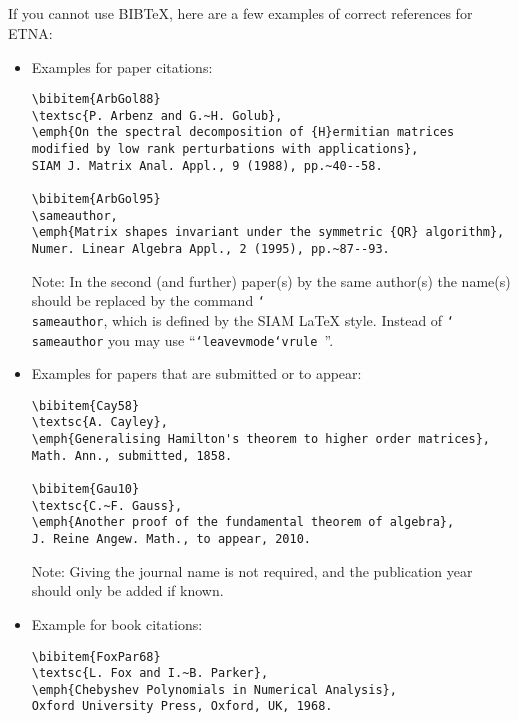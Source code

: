 \documentclass[10pt]{article}
\begin{document}
\begin{center}\begin{verbatim}
         
         
\end{verbatim}\end{center}
%
If you cannot use BIBTeX, here are a few examples of correct
references for ETNA:

\begin{itemize}
\item Examples for paper citations:

\begin{verbatim}
\bibitem{ArbGol88}
\textsc{P. Arbenz and G.~H. Golub},
\emph{On the spectral decomposition of {H}ermitian matrices
modified by low rank perturbations with applications},
SIAM J. Matrix Anal. Appl., 9 (1988), pp.~40--58.

\bibitem{ArbGol95}
\sameauthor,
\emph{Matrix shapes invariant under the symmetric {QR} algorithm},
Numer. Linear Algebra Appl., 2 (1995), pp.~87--93.
\end{verbatim}
%
Note: In the second (and further) paper(s) by the same author(s) the
name(s) should be replaced by the command {\tt \char`\\sameauthor}, which
is defined by the SIAM LaTeX style. Instead of {\tt \char`\\sameauthor} you may use
``\mbox{\tt \char`\\leavevmode\char`\\vrule height 2pt depth -1.6pt width 23pt}''.

\item Examples for papers that are submitted or to appear:

\begin{verbatim}
\bibitem{Cay58}
\textsc{A. Cayley},
\emph{Generalising Hamilton's theorem to higher order matrices},
Math. Ann., submitted, 1858.

\bibitem{Gau10}
\textsc{C.~F. Gauss},
\emph{Another proof of the fundamental theorem of algebra},
J. Reine Angew. Math., to appear, 2010.
\end{verbatim}

Note: Giving the journal name is not required, and the publication year
should only be added if known.

\item Example for book citations:

\begin{verbatim}
\bibitem{FoxPar68}
\textsc{L. Fox and I.~B. Parker},
\emph{Chebyshev Polynomials in Numerical Analysis},
Oxford University Press, Oxford, UK, 1968.
\end{verbatim}


\end{itemize}
\end{document}
